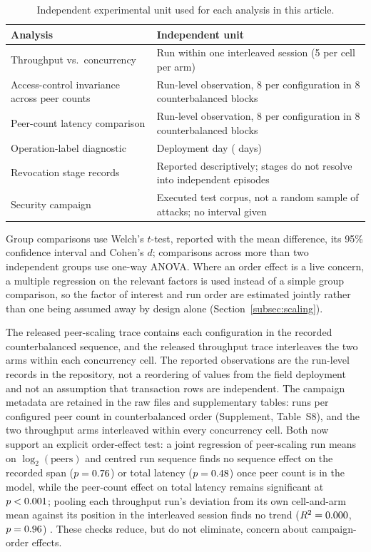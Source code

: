 \documentclass[a4paper,fleqn]{cas-sc}
\begin{document}
\begin{table}[pos=t]
\caption{Independent experimental unit used for each analysis in this article.}
\label{tab:units}
\small
\begin{tabularx}{\columnwidth}{@{}lX@{}}
\toprule
Analysis & Independent unit \\
\midrule
Throughput vs.\ concurrency &
  Run within one interleaved session (5 per cell per arm) \\
Access-control invariance across peer counts &
  Run-level observation, 8 per configuration in 8 counterbalanced blocks \\
Peer-count latency comparison &
  Run-level observation, 8 per configuration in 8 counterbalanced blocks \\
Operation-label diagnostic &
  Deployment day (\DeployDays{} days) \\
Revocation stage records &
  Reported descriptively; stages do not resolve into independent episodes \\
Security campaign &
  Executed test corpus, not a random sample of attacks; no interval given \\
\bottomrule
\end{tabularx}
\end{table}

Group comparisons use Welch's $t$-test, reported with the mean difference,
its 95\% confidence interval and Cohen's $d$; comparisons across more than
two independent groups use one-way ANOVA. Where an order effect is a live
concern, a multiple regression on the relevant factors is used instead of a
simple group comparison, so the factor of interest and run order are
estimated jointly rather than one being assumed away by design alone
(Section~\ref{subsec:scaling}).

The released peer-scaling trace contains each configuration in the recorded
counterbalanced sequence, and the released throughput trace interleaves the
two arms within each concurrency cell. The reported observations are the
run-level records in the repository, not a reordering of values from the
field deployment and not an assumption that transaction rows are
independent. The campaign metadata are retained in the raw files and
supplementary tables: \PartRunsPerConfig{} runs per configured peer count in
counterbalanced order (Supplement, Table~S8), and the two throughput arms
interleaved within every concurrency cell. Both now support an explicit
order-effect
test: a joint regression of peer-scaling run means on $\log_2(\text{peers})$
and centred run sequence finds no sequence effect on the recorded span
($p=0.76$) or total latency ($p=0.48$) once
peer count is in the model, while the peer-count effect on total latency
remains significant at $p<0.001$; pooling each throughput
run's deviation from its own cell-and-arm mean against its position in the
interleaved session finds no trend ($R^2=0.000$, $p=0.96$)
. These checks reduce, but do not eliminate, concern about campaign-order
effects.
\end{document}
